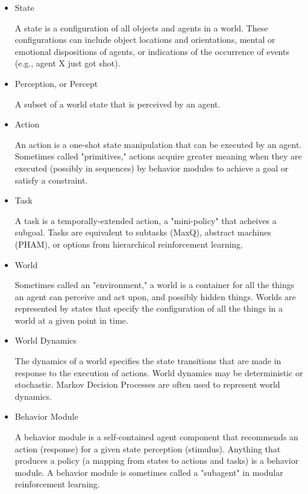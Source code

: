 \begin{itemize}

\item State

  A state is a configuration of all objects and agents in a world.
  These configurations can include object locations and orientations,
  mental or emotional dispositions of agents, or indications of the
  occurrence of events (e.g., agent X just got shot).

\item Perception, or Percept

  A subset of a world state that is perceived by an agent.

\item Action

  An action is a one-shot state manipulation that can be executed by
  an agent.  Sometimes called "primitives," actions acquire greater
  meaning when they are executed (possibly in sequences) by behavior
  modules to achieve a goal or satisfy a constraint.

\item Task

  A task is a temporally-extended action, a "mini-policy" that acheives a
  subgoal.  Tasks are equivalent to subtasks (MaxQ), abstract machines
  (PHAM), or options from hierarchical reinforcement learning.

\item World

  Sometimes called an "environment," a world is a container for all
  the things an agent can perceive and act upon, and possibly hidden
  things.  Worlds are represented by states that specify the
  configuration of all the things in a world at a given point in time.

\item World Dynamics

  The dynamics of a world specifies the state transitions that are
  made in response to the execution of actions.  World dynamics may be
  deterministic or stochastic.  Markov Decision Processes are often
  used to represent world dynamics.

\item Behavior Module

  A behavior module is a self-contained agent component that
  recommends an action (response) for a given state perception
  (stimulus).  Anything that produces a policy (a mapping from states
  to actions and tasks) is a behavior module.  A behavior module is
  sometimes called a "subagent" in modular reinforcement learning.


\end{itemize}
